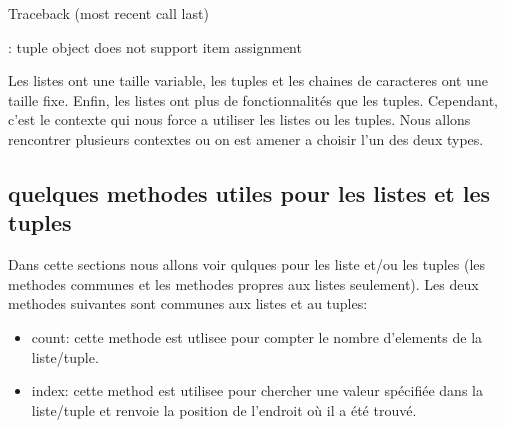 \documentclass[letterpaper,10pt,french]{sphinxmanual}
\begin{document}
\begin{sphinxVerbatim}[commandchars=\\\{\}]
Traceback (most recent call last)
\PYGZbs{}\PYGZbs{}\PYGZbs{}\PYGZbs{}\PYGZbs{}  
 \PYG{p}{[}\PYG{p}{]}  
 

: \PYGZsq{}tuple\PYGZsq{} object does not support item assignment
\end{sphinxVerbatim}

\sphinxAtStartPar
Les listes ont une taille variable, les tuples et les chaines de caracteres ont une taille fixe. Enfin, les listes ont plus de fonctionnalités que les tuples. Cependant, c’est le contexte qui nous force a utiliser les listes ou les tuples. Nous allons rencontrer plusieurs contextes ou on est amener a choisir l’un des deux types.


\subsection{quelques methodes utiles pour les listes et les tuples}
\label{\detokenize{ch4:quelques-methodes-utiles-pour-les-listes-et-les-tuples}}
\sphinxAtStartPar
Dans cette sections nous allons voir qulques   pour les liste et/ou les tuples (les methodes communes et les methodes propres aux listes seulement). Les deux methodes suivantes sont communes aux listes et au tuples:
\begin{itemize}
\item {} 
\sphinxAtStartPar
count: cette methode est utlisee pour compter le nombre d’elements de la liste/tuple.

\item {} 
\sphinxAtStartPar
index: cette method est utilisee pour chercher une valeur spécifiée dans la liste/tuple et renvoie la position de l’endroit où il a été trouvé.

\end{itemize}
\end{document}
